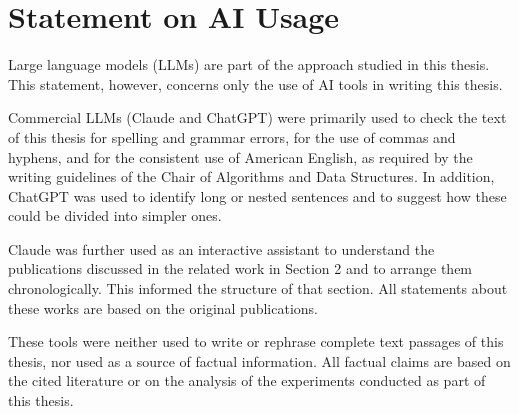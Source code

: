 \newpage
\begingroup
\setlength{\parindent}{0pt}

\section*{Statement on AI Usage}

\bigskip
\bigskip
\bigskip

Large language models (LLMs) are part of the approach studied in this thesis. This statement, however, concerns only the use of AI tools in writing this thesis.

Commercial LLMs (Claude and ChatGPT) were primarily used to check the text of this thesis for spelling and grammar errors, for the use of commas and hyphens, and for the consistent use of American English, as required by the writing guidelines of the Chair of Algorithms and Data Structures. In addition, ChatGPT was used to identify long or nested sentences and to suggest how these could be divided into simpler ones.

Claude was further used as an interactive assistant to understand the publications discussed in the related work in Section 2 and to arrange them chronologically. This informed the structure of that section. All statements about these works are based on the original publications.

These tools were neither used to write or rephrase complete text passages of this thesis, nor used as a source of factual information. All factual claims are based on the cited literature or on the analysis of the experiments conducted as part of this thesis.






